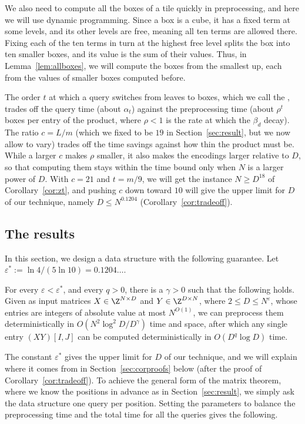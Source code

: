 We also need to compute all the boxes of a tile quickly in preprocessing, and here we will use dynamic programming. Since a box is a cube, it has a fixed term at some levels, and its other levels are free, meaning all ten terms are allowed there. Fixing each of the ten terms in turn at the highest free level splits the box into ten smaller boxes, and its value is the sum of their values. Thus, in Lemma~\ref{lem:allboxes}, we will compute the boxes from the smallest up, each from the values of smaller boxes computed before.

The order $t$ at which a query switches from leaves to boxes, which we call the , trades off the query time (about $\alpha_t$) against the preprocessing time (about $\rho^t$ boxes per entry of the product, where $\rho<1$ is the rate at which the $\beta_d$ decay). The ratio $c=L/m$ (which we fixed to be $19$ in Section~\ref{sec:result}, but we now allow to vary) trades off the time savings against how thin the product must be. While a larger $c$ makes $\rho$ smaller, it also makes the encodings larger relative to $D$, so that computing them stays within the time bound only when $N$ is a larger power of $D$. With $c=21$ and $t=m/9$, we will get the instance $N\ge D^{18}$ of Corollary~\ref{cor:zt}, and pushing $c$ down toward $10$ will give the upper limit for $D$ of our technique, namely $D\le N^{0.1204}$  (Corollary~\ref{cor:tradeoff}).

\subsection{The results}\label{sec:results}

In this section, we design a data structure with the following guarantee. Let $\varepsilon^*:=\ln4/(5\ln10)=0.1204\ldots$.

\begin{theorem}\label{thm:single}
For every $\varepsilon<\varepsilon^*$, and every $q>0$, there is a $\gamma>0$ such that the following holds. Given as input matrices $X\in\Z^{N\times D}$ and $Y\in\Z^{D\times N}$, where $2\le D\le N^{\varepsilon}$, whose entries are integers of absolute value at most $N^{O(1)}$, we can preprocess them deterministically in $O(N^2\log^2\!D/D^{\gamma})$ time and space, after which any single entry $(XY)[I,J]$ can be computed deterministically in $O(D^{q}\log D)$ time.
\end{theorem}

The constant $\varepsilon^*$ gives the upper limit for $D$ of our technique, and we will explain where it comes from in Section~\ref{sec:corproofs} below (after the proof of Corollary~\ref{cor:tradeoff}). To achieve the general form of the matrix theorem, where we know the positions in advance as in Section~\ref{sec:result}, we simply ask the data structure one query per position. Setting the parameters to balance the preprocessing time and the total time for all the queries gives the following.

